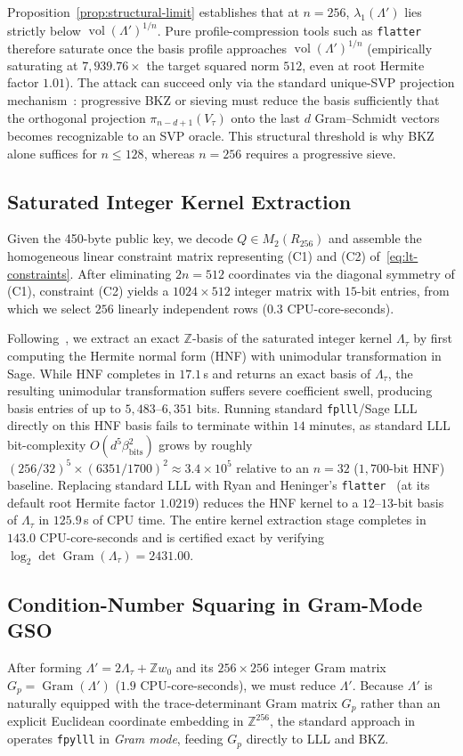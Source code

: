 \documentclass[11pt,a4paper]{article}
\theoremstyle{definition}
\newcommand{\Z}{\mathbb{Z}}
\newcommand{\Lt}{\Lambda_\tau}
\newcommand{\Lp}{\Lambda'}
\newcommand{\Vt}{V_\tau}
\newcommand{\vol}{\operatorname{vol}}
\newcommand{\Gram}{\operatorname{Gram}}
\begin{document}
Proposition~\ref{prop:structural-limit} establishes that at $n=256$, $\lambda_1(\Lp)$ lies strictly below $\vol(\Lp)^{1/n}$. Pure profile-compression tools such as \texttt{flatter}~\cite{RH23} therefore saturate once the basis profile approaches $\vol(\Lp)^{1/n}$ (empirically saturating at $7{,}939.76\times$ the target squared norm $512$, even at root Hermite factor $1.01$). The attack can succeed only via the standard unique-SVP projection mechanism~\cite{AD21}: progressive BKZ or sieving must reduce the basis sufficiently that the orthogonal projection $\pi_{n-d+1}(\Vt)$ onto the last $d$ Gram--Schmidt vectors becomes recognizable to an SVP oracle. This structural threshold is why BKZ alone suffices for $n \le 128$, whereas $n=256$ requires a progressive sieve.

\subsection{Saturated Integer Kernel Extraction}
Given the 450-byte public key, we decode $Q \in M_2(R_{256})$ and assemble the homogeneous linear constraint matrix representing (C1) and (C2) of~\eqref{eq:lt-constraints}. After eliminating $2n=512$ coordinates via the diagonal symmetry of (C1), constraint (C2) yields a $1024 \times 512$ integer matrix with $15$-bit entries, from which we select $256$ linearly independent rows ($0.3$ CPU-core-seconds).

Following~\cite{SW26}, we extract an exact $\Z$-basis of the saturated integer kernel $\Lt$ by first computing the Hermite normal form (HNF) with unimodular transformation in Sage. While HNF completes in $17.1$\,s and returns an exact basis of $\Lt$, the resulting unimodular transformation suffers severe coefficient swell, producing basis entries of up to $5{,}483$--$6{,}351$ bits. Running standard \texttt{fplll}/Sage LLL directly on this HNF basis fails to terminate within $14$ minutes, as standard LLL bit-complexity $O(d^5 \beta_{\mathrm{bits}}^2)$ grows by roughly $(256/32)^5 \times (6351/1700)^2 \approx 3.4 \times 10^5$ relative to an $n=32$ ($1{,}700$-bit HNF) baseline. Replacing standard LLL with Ryan and Heninger's \texttt{flatter}~\cite{RH23} (at its default root Hermite factor $1.0219$) reduces the HNF kernel to a $12$--$13$-bit basis of $\Lt$ in $125.9$\,s of CPU time. The entire kernel extraction stage completes in $143.0$ CPU-core-seconds and is certified exact by verifying $\log_2 \det \Gram(\Lt) = 2431.00$.

\subsection{Condition-Number Squaring in Gram-Mode GSO}
After forming $\Lp = 2\Lt + \Z w_0$ and its $256 \times 256$ integer Gram matrix $G_p = \Gram(\Lp)$ ($1.9$ CPU-core-seconds), we must reduce $\Lp$. Because $\Lp$ is naturally equipped with the trace-determinant Gram matrix $G_p$ rather than an explicit Euclidean coordinate embedding in $\Z^{256}$, the standard approach in~\cite{SW26} operates \texttt{fpylll} in \emph{Gram mode}, feeding $G_p$ directly to LLL and BKZ.
\end{document}

